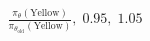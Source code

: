 \documentclass[preview]{standalone}
\begin{document}
\begin{align*}
\frac{\pi_\theta(\text{Yellow})}{\pi_{\theta_{\text{old}}}(\text{Yellow})},\; 0.95,\; 1.05
\end{align*}
\end{document}
